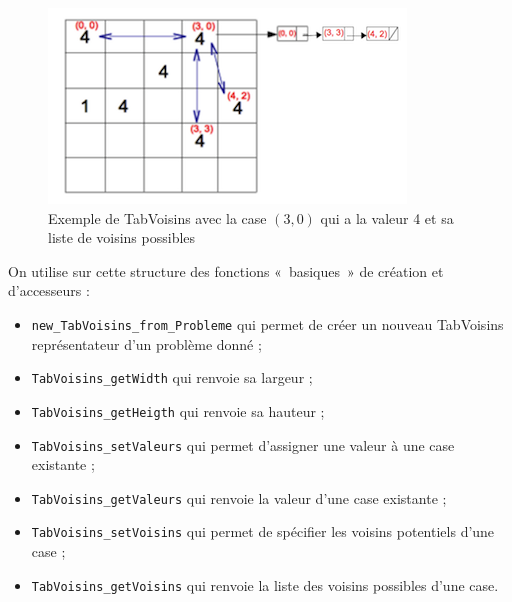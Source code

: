\begin{figure}[h]
 \centering
 \includegraphics{structures1b}
\caption{Exemple de TabVoisins avec la case $(3, 0)$ qui a la valeur 4 et sa liste de voisins possibles}
\end{figure}

On utilise sur cette structure des fonctions «~basiques~» de création et d'accesseurs :
\begin{itemize}
\item \verb|new_TabVoisins_from_Probleme| qui permet de créer un nouveau TabVoisins représentateur d’un problème donné ;
\item \verb|TabVoisins_getWidth| qui renvoie sa largeur ;
\item \verb|TabVoisins_getHeigth| qui renvoie sa hauteur ; 
\item \verb|TabVoisins_setValeurs| qui permet d'assigner une valeur à une case existante ; 
\item \verb|TabVoisins_getValeurs| qui renvoie la valeur d'une case existante ;
\item \verb|TabVoisins_setVoisins| qui permet de spécifier les voisins potentiels d'une case ; 
\item \verb|TabVoisins_getVoisins| qui renvoie la liste des voisins possibles d'une case.
\end{itemize}
